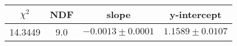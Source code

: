 \begin{tabular}{|c|c|c|c|}

\hline
$\chi^{2}$ & NDF & slope & y-intercept  \\
\hline
14.3449 & 9.0 & $-0.0013\pm0.0001$ & $1.1589\pm0.0107$ \\
\hline

\end{tabular}